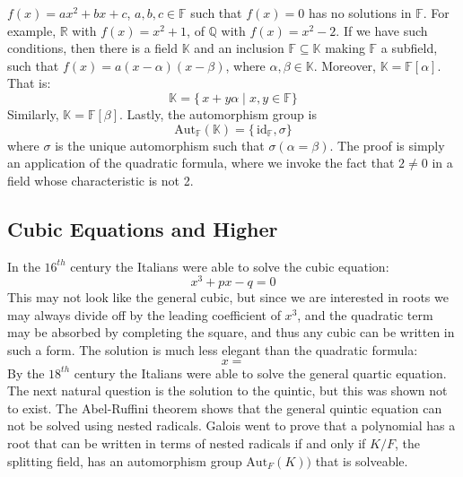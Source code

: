     $f(x)=ax^{2}+bx+c$, $a,b,c\in\mathbb{F}$ such that $f(x)=0$ has no
    solutions in $\mathbb{F}$. For example, $\mathbb{R}$ with
    $f(x)=x^{2}+1$, of $\mathbb{Q}$ with $f(x)=x^{2}-2$. If we have
    such conditions, then there is a field $\mathbb{K}$ and an inclusion
    $\mathbb{F}\subseteq\mathbb{K}$ making $\mathbb{F}$ a subfield,
    such that $f(x)=a(x-\alpha)(x-\beta)$, where
    $\alpha,\beta\in\mathbb{K}$. Moreover,
    $\mathbb{K}=\mathbb{F}[\alpha]$. That is:
    \begin{equation}
        \mathbb{K}=\{\,x+y\alpha\;|\;x,y\in\mathbb{F}\}
    \end{equation}
    Similarly, $\mathbb{K}=\mathbb{F}[\beta]$. Lastly, the automorphism
    group is
    \begin{equation}
        \textrm{Aut}_{\mathbb{F}}(\mathbb{K})
        =\{\,\textrm{id}_{\mathbb{F}},\sigma\}
    \end{equation}
    where $\sigma$ is the unique automorphism such that
    $\sigma(\alpha=\beta)$. The proof is simply an application of the
    quadratic formula, where we invoke the fact that $2\ne{0}$ in a
    field whose characteristic is not 2.
\subsection{Cubic Equations and Higher}
    In the $16^{th}$ century the Italians were able to solve the cubic
    equation:
    \begin{equation}
        x^{3}+px-q=0
    \end{equation}
    This may not look like the general cubic, but since we are
    interested in roots we may always divide off by the leading
    coefficient of $x^{3}$, and the quadratic term may be
    absorbed by completing the square, and thus any cubic can be
    written in such a form. The solution is much less elegant than the
    quadratic formula:
    \begin{equation}
        x=
    \end{equation}
    By the $18^{th}$ century the Italians were able to solve the general
    quartic equation. The next natural question is the solution to the
    quintic, but this was shown not to exist. The Abel-Ruffini theorem
    shows that the general quintic equation can not be solved using
    nested radicals. Galois went to prove that a polynomial has a root
    that can be written in terms of nested radicals if and only if
    $K/F$, the splitting field, has an automorphism group
    $\textrm{Aut}_{F}(K))$ that is solveable.
